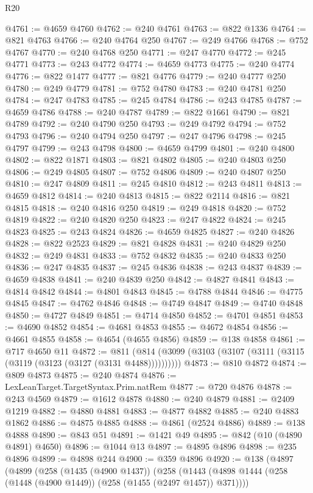 \begin{lexlean}{R20}
\begin{coremodule}
{@4761 := @4659 @4760
@4762 := @240 @4761
@4763 := @822 @1336
@4764 := @821 @4763
@4766 := @240 @4764 @250
@4767 := @249 @4766
@4768 := @752 @4767
@4770 := @240 @4768 @250
@4771 := @247 @4770
@4772 := @245 @4771
@4773 := @243 @4772
@4774 := @4659 @4773
@4775 := @240 @4774
@4776 := @822 @1477
@4777 := @821 @4776
@4779 := @240 @4777 @250
@4780 := @249 @4779
@4781 := @752 @4780
@4783 := @240 @4781 @250
@4784 := @247 @4783
@4785 := @245 @4784
@4786 := @243 @4785
@4787 := @4659 @4786
@4788 := @240 @4787
@4789 := @822 @1661
@4790 := @821 @4789
@4792 := @240 @4790 @250
@4793 := @249 @4792
@4794 := @752 @4793
@4796 := @240 @4794 @250
@4797 := @247 @4796
@4798 := @245 @4797
@4799 := @243 @4798
@4800 := @4659 @4799
@4801 := @240 @4800
@4802 := @822 @1871
@4803 := @821 @4802
@4805 := @240 @4803 @250
@4806 := @249 @4805
@4807 := @752 @4806
@4809 := @240 @4807 @250
@4810 := @247 @4809
@4811 := @245 @4810
@4812 := @243 @4811
@4813 := @4659 @4812
@4814 := @240 @4813
@4815 := @822 @2114
@4816 := @821 @4815
@4818 := @240 @4816 @250
@4819 := @249 @4818
@4820 := @752 @4819
@4822 := @240 @4820 @250
@4823 := @247 @4822
@4824 := @245 @4823
@4825 := @243 @4824
@4826 := @4659 @4825
@4827 := @240 @4826
@4828 := @822 @2523
@4829 := @821 @4828
@4831 := @240 @4829 @250
@4832 := @249 @4831
@4833 := @752 @4832
@4835 := @240 @4833 @250
@4836 := @247 @4835
@4837 := @245 @4836
@4838 := @243 @4837
@4839 := @4659 @4838
@4841 := @240 @4839 @250
@4842 := @4827 @4841
@4843 := @4814 @4842
@4844 := @4801 @4843
@4845 := @4788 @4844
@4846 := @4775 @4845
@4847 := @4762 @4846
@4848 := @4749 @4847
@4849 := @4740 @4848
@4850 := @4727 @4849
@4851 := @4714 @4850
@4852 := @4701 @4851
@4853 := @4690 @4852
@4854 := @4681 @4853
@4855 := @4672 @4854
@4856 := @4661 @4855
@4858 := @4654 (@4655 @4856)
@4859 := @138 @4858
@4861 := @717 @4650 @11
@4872 := @811 (@814 (@3099 (@3103 (@3107 (@3111 (@3115 (@3119 (@3123 (@3127 (@3131 @4488))))))))))
@4873 := @810 @4872
@4874 := @809 @4873
@4875 := @240 @4874
@4876 := LexLeanTarget.TargetSyntax.Prim.natRem
@4877 := @720 @4876
@4878 := @243 @4569
@4879 := @1612 @4878
@4880 := @240 @4879
@4881 := @2409 @1219
@4882 := @4880 @4881
@4883 := @4877 @4882
@4885 := @240 @4883 @1862
@4886 := @4875 @4885
@4888 := @4861 (@2524 @4886)
@4889 := @138 @4888
@4890 := @843 @51
@4891 := @1421 @49
@4895 := @842 (@10 (@4890 @4891) @4650)
@4896 := @1044 @13
@4897 := @4895 @4896
@4898 := @235 @4896
@4899 := @4898 @244
@4900 := @359 @4896
@4920 := @138
    (@4897
      (@4899
        (@258
          (@1435 (@4900 @1437))
          (@258
            (@1443 (@4898 @1444 (@258 (@1448 (@4900 @1449)) (@258 (@1455 (@2497 @1457)) @371))))
}
\end{coremodule}
\end{lexlean}
